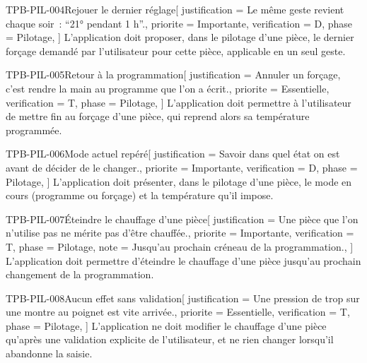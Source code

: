 \begin{exigence}{TPB-PIL-004}{Rejouer le dernier réglage}[
    justification = {Le même geste revient chaque soir~: \enquote{21° pendant 1 h}.},
    priorite      = {Importante},
    verification  = {D},
    phase         = {Pilotage},
  ]
  L'application doit proposer, dans le pilotage d'une pièce, le dernier forçage demandé
  par l'utilisateur pour cette pièce, applicable en un seul geste.
\end{exigence}

\begin{exigence}{TPB-PIL-005}{Retour à la programmation}[
    justification = {Annuler un forçage, c'est rendre la main au programme que l'on a
                     écrit.},
    priorite      = {Essentielle},
    verification  = {T},
    phase         = {Pilotage},
  ]
  L'application doit permettre à l'utilisateur de mettre fin au forçage d'une pièce, qui
  reprend alors sa température programmée.
\end{exigence}

\begin{exigence}{TPB-PIL-006}{Mode actuel repéré}[
    justification = {Savoir dans quel état on est avant de décider de le changer.},
    priorite      = {Importante},
    verification  = {D},
    phase         = {Pilotage},
  ]
  L'application doit présenter, dans le pilotage d'une pièce, le mode en cours (programme
  ou forçage) et la température qu'il impose.
\end{exigence}

\begin{exigence}{TPB-PIL-007}{Éteindre le chauffage d'une pièce}[
    justification = {Une pièce que l'on n'utilise pas ne mérite pas d'être chauffée.},
    priorite      = {Importante},
    verification  = {T},
    phase         = {Pilotage},
    note          = {Jusqu'au prochain créneau de la programmation.},
  ]
  L'application doit permettre d'éteindre le chauffage d'une pièce jusqu'au prochain
  changement de la programmation.
\end{exigence}

\begin{exigence}{TPB-PIL-008}{Aucun effet sans validation}[
    justification = {Une pression de trop sur une montre au poignet est vite arrivée.},
    priorite      = {Essentielle},
    verification  = {T},
    phase         = {Pilotage},
  ]
  L'application ne doit modifier le chauffage d'une pièce qu'après une validation
  explicite de l'utilisateur, et ne rien changer lorsqu'il abandonne la saisie.
\end{exigence}

